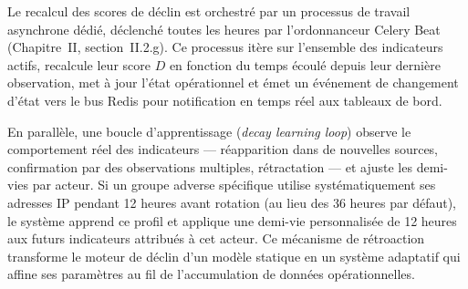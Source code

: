 Le recalcul des scores de déclin est orchestré par un processus de travail asynchrone dédié, déclenché toutes les heures par l'ordonnanceur Celery Beat (Chapitre~II, section~II.2.g). Ce processus itère sur l'ensemble des indicateurs actifs, recalcule leur score $D$ en fonction du temps écoulé depuis leur dernière observation, met à jour l'état opérationnel et émet un événement de changement d'état vers le bus Redis pour notification en temps réel aux tableaux de bord.

En parallèle, une boucle d'apprentissage (\textit{decay learning loop}) observe le comportement réel des indicateurs --- réapparition dans de nouvelles sources, confirmation par des observations multiples, rétractation --- et ajuste les demi-vies par acteur. Si un groupe adverse spécifique utilise systématiquement ses adresses IP pendant 12 heures avant rotation (au lieu des 36 heures par défaut), le système apprend ce profil et applique une demi-vie personnalisée de 12 heures aux futurs indicateurs attribués à cet acteur. Ce mécanisme de rétroaction transforme le moteur de déclin d'un modèle statique en un système adaptatif qui affine ses paramètres au fil de l'accumulation de données opérationnelles.
